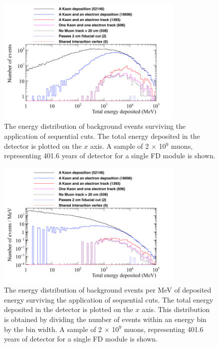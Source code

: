 \begin{figure}
  \centering
  \includegraphics[width=0.8\textwidth]{CosmicBackground_EnergyDepCuts_Raw_2cmCut}
  \caption[The energy distribution of background events surviving the application of sequential cuts.]
          {The energy distribution of background events surviving the application of sequential cuts. The total energy deposited in the detector is plotted on the $x$ axis. A sample of 2 $\times$ 10$^9$ muons, representing 401.6 years of detector for a single FD module is shown.}
  \label{fig:NDK_CosmoBack_Raw}
\end{figure}

\begin{figure}
  \centering
  \includegraphics[width=0.8\textwidth]{CosmicBackground_EnergyDepCuts_Norm_2cmCut}
  \caption[The energy distribution of background events per MeV of deposited energy surviving the application of sequential cuts]
          {The energy distribution of background events per MeV of deposited energy surviving the application of sequential cuts. The total energy deposited in the detector is plotted on the $x$ axis. This distribution is obtained by dividing the number of events within an energy bin by the bin width. A sample of 2 $\times$ 10$^9$ muons, representing 401.6 years of detector for a single FD module is shown.}
  \label{fig:NDK_CosmoBack_Norm}
\end{figure}

